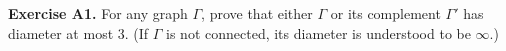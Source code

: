 \textbf{Exercise A1.}
For any graph $\Gamma$, prove that either $\Gamma$ or its complement $\Gamma'$ has diameter at most $3$. (If $\Gamma$ is not connected, its diameter is understood to be $\infty$.)
